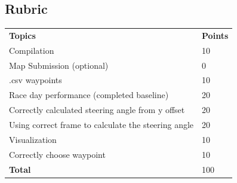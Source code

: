 \documentclass[letta4 paper]{article}
\numberwithin{equation}{section}
\newcommand{\0}{\mathbf{0}}
\begin{document}
	\subsection{Rubric}
	\begin{table}[h]
		\begin{tabular}{ll}
			\textbf{Topics} & \textbf{Points} \\
			Compilation & 	10 \\
			Map Submission (optional) & 	0 \\
			.csv waypoints & 	10 \\
			Race day performance (completed baseline) & 	20 \\
			Correctly calculated steering angle from y offset & 	20 \\
			Using correct frame to calculate the steering angle & 	20 \\
			Visualization & 	10 \\
			Correctly choose waypoint & 	10 \\
			\textbf{Total} & 100 \\
		\end{tabular}
	\end{table}
	

	
			
\end{document}
